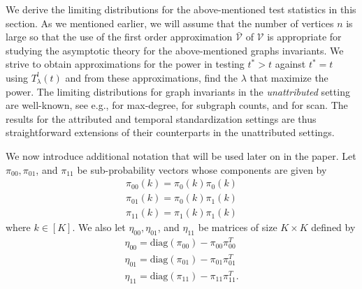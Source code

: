 \documentclass[10pt,draftclsnofoot,onecolumn]{IEEEtran}
\theoremstyle{definition}
\begin{document}
We derive the limiting distributions for the above-mentioned test
statistics in this section. As we 
mentioned earlier, we will assume that the number of
vertices $n$ is large so that the use of the first order
approximation $\bar{\mathscr{V}}$ of $\mathscr{V}$ is appropriate for
studying the asymptotic theory for the above-mentioned graphs
invariants. We strive to obtain approximations for the power 
in testing $t^{*} > t$
against $t^{*} = t$ using $T_{\lambda}^{l}(t)$ and from these
approximations, find the $\lambda$ that maximize the power. 
The limiting distributions for graph
invariants in the {\em unattributed} setting are well-known, see 
e.g., \cite{bollobas85:_random_graph} for max-degree,
\cite{nowicki88:_subgr_u_statis_method} 
for subgraph counts, and \cite{rukhin12} for scan. The results
for the attributed and temporal standardization settings are thus 
straightforward extensions of
their counterparts in the unattributed settings.
 
We now introduce additional notation that will be used later on in the
paper. Let $\pi_{00}, \pi_{01}$, and $\pi_{11}$ be
sub-probability vectors whose components are given by
\begin{gather*}
  \pi_{00}(k) = \pi_{0}(k) \pi_{0}(k) \\
  \pi_{01}(k) = \pi_{0}(k) \pi_{1}(k) \\
  \pi_{11}(k) = \pi_{1}(k) \pi_{1}(k)
\end{gather*}
where $k \in [K]$. We also let $\eta_{00}, \eta_{01}$, and
$\eta_{11}$ be matrices of size $K \times K$ defined by 
\begin{gather*}
  \eta_{00} = \mathrm{diag}(\pi_{00}) - \pi_{00} \pi_{00}^{T} \\
  \eta_{01} = \mathrm{diag}(\pi_{01}) - \pi_{01} \pi_{01}^{T} \\
  \eta_{11} = \mathrm{diag}(\pi_{11}) - \pi_{11} \pi_{11}^{T}.
\end{gather*}
\end{document}
